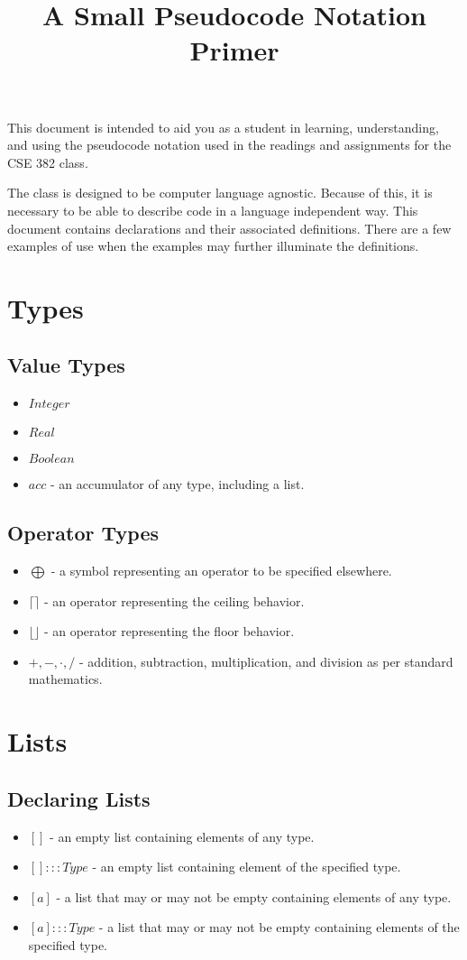 \documentclass[12pt]{amsart}
\title{A Small Pseudocode Notation Primer}
\begin{document}
\maketitle

This document is intended to aid you as a student in learning, understanding, and using the pseudocode notation used in the readings and assignments for the  CSE 382 class.

The class is designed to be computer language agnostic. Because of this, it is necessary to be able to describe code in a language independent way. This document contains declarations and their associated definitions. There are a few examples of use when the examples may further illuminate the definitions.

\section{Types}
\subsection{Value Types}
\begin{itemize}
\item $Integer$
\item $Real$
\item $Boolean$
\item $acc$ - an accumulator of any type, including a list.
\end{itemize}
\subsection{Operator Types}
\begin{itemize}
\item $\bigoplus$ - a symbol representing an operator to be specified elsewhere.
\item $\lceil \rceil$ - an operator representing the ceiling behavior.
\item $\lfloor \rfloor$ - an operator representing the floor behavior.
\item $+,-,\cdot,/$ - addition, subtraction, multiplication, and division as per standard mathematics.
\end{itemize}
\section{Lists}
\subsection{Declaring Lists}
\begin{itemize}
\item $[]$ - an empty list containing elements of any type.
\item $[]:::Type$ - an empty list containing element of the specified type.
\item $[a]$ - a list that may or may not be empty containing elements of any type.
\item $[a]:::Type$ - a list that may or may not be empty containing elements of the specified type.
\end{itemize}
\end{document}
